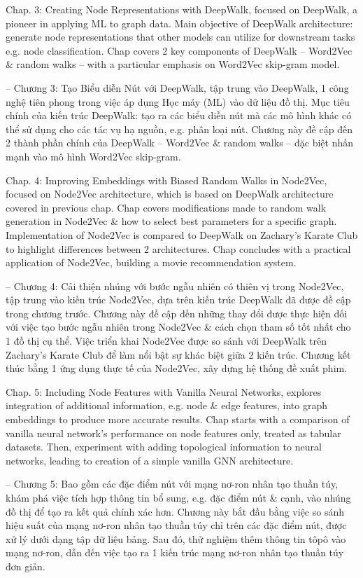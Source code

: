 \documentclass{article}
\begin{document}
\begin{itemize}
\begin{itemize}
        Chap. 3: Creating Node Representations with DeepWalk, focused on DeepWalk, a pioneer in applying ML to graph data. Main objective of DeepWalk architecture: generate node representations that other models can utilize for downstream tasks e.g. node classification. Chap covers 2 key components of DeepWalk -- Word2Vec \& random walks -- with a particular emphasis on Word2Vec skip-gram model.

        -- Chương 3: Tạo Biểu diễn Nút với DeepWalk, tập trung vào DeepWalk, 1 công nghệ tiên phong trong việc áp dụng Học máy (ML) vào dữ liệu đồ thị. Mục tiêu chính của kiến trúc DeepWalk: tạo ra các biểu diễn nút mà các mô hình khác có thể sử dụng cho các tác vụ hạ nguồn, e.g. phân loại nút. Chương này đề cập đến 2 thành phần chính của DeepWalk -- Word2Vec \& random walks -- đặc biệt nhấn mạnh vào mô hình Word2Vec skip-gram.

        Chap. 4: Improving Embeddings with Biased Random Walks in Node2Vec, focused on Node2Vec architecture, which is based on DeepWalk architecture covered in previous chap. Chap covers modifications made to random walk generation in Node2Vec \& how to select best parameters for a specific graph. Implementation of Node2Vec is compared to DeepWalk on Zachary's Karate Club to highlight differences between 2 architectures. Chap concludes with a practical application of Node2Vec, building a movie recommendation system.

        -- Chương 4: Cải thiện nhúng với bước ngẫu nhiên có thiên vị trong Node2Vec, tập trung vào kiến trúc Node2Vec, dựa trên kiến trúc DeepWalk đã được đề cập trong chương trước. Chương này đề cập đến những thay đổi được thực hiện đối với việc tạo bước ngẫu nhiên trong Node2Vec \& cách chọn tham số tốt nhất cho 1 đồ thị cụ thể. Việc triển khai Node2Vec được so sánh với DeepWalk trên Zachary's Karate Club để làm nổi bật sự khác biệt giữa 2 kiến trúc. Chương kết thúc bằng 1 ứng dụng thực tế của Node2Vec, xây dựng hệ thống đề xuất phim.

        Chap. 5: Including Node Features with Vanilla Neural Networks, explores integration of additional information, e.g. node \& edge features, into graph embeddings to produce more accurate results. Chap starts with a comparison of vanilla neural network's performance on node features only, treated as tabular datasets. Then, experiment with adding topological information to neural networks, leading to creation of a simple vanilla GNN architecture.

        -- Chương 5: Bao gồm các đặc điểm nút với mạng nơ-ron nhân tạo thuần túy, khám phá việc tích hợp thông tin bổ sung, e.g. đặc điểm nút \& cạnh, vào nhúng đồ thị để tạo ra kết quả chính xác hơn. Chương này bắt đầu bằng việc so sánh hiệu suất của mạng nơ-ron nhân tạo thuần túy chỉ trên các đặc điểm nút, được xử lý dưới dạng tập dữ liệu bảng. Sau đó, thử nghiệm thêm thông tin tôpô vào mạng nơ-ron, dẫn đến việc tạo ra 1 kiến trúc mạng nơ-ron nhân tạo thuần túy đơn giản.


\end{itemize}
\end{itemize}
\end{document}

